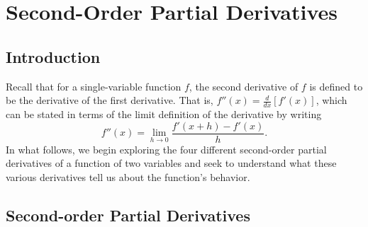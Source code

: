 \section{Second-Order Partial Derivatives} \label{S:10.3.Second_Order_Partial_Derivatives}

\vspace*{-14 pt}

\subsection*{Introduction}

Recall that for a single-variable function $f$, the second derivative of $f$ is defined to be the derivative of the first derivative.  That is, $f''(x) = \frac{d}{dx}[f'(x)]$, which can be stated in terms of the limit definition of the derivative by writing
$$f''(x) = \lim_{h \to 0} \frac{f'(x+h) - f'(x)}{h}.$$
In what follows, we begin exploring the four different second-order partial derivatives of a function of two variables and seek to understand what these various derivatives tell us about the function's behavior.




\subsection*{Second-order Partial Derivatives}


